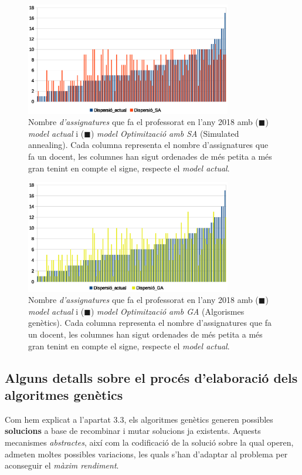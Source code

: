 \documentclass[10pt,twocolumn]{article}
\begin{document}
	\begin{figure}[!]
		\centering
		\includegraphics[width=9cm]{disp_sorted_sa}
		\caption{ \small Nombre \textit{d'assignatures} que fa el professorat en l'any 2018 amb  ({\color{blue!70}$\blacksquare$}) \textit{model actual} i ({\color{orange!70!red!90}$\blacksquare$}) \textit{model Optimització amb SA} (Simulated annealing). Cada columna representa el nombre d'assignatures que fa un docent, les columnes han sigut ordenades de més petita a més gran tenint en compte el signe, respecte el \textit{model actual}. }
		\label{fig:sor}
	\end{figure}
	\begin{figure}[!]
		\centering
		\includegraphics[width=9cm]{disp_sorted_ga}
		\caption{ \small  Nombre \textit{d'assignatures} que fa el professorat en l'any 2018 amb  ({\color{blue!70}$\blacksquare$}) \textit{model actual} i ({\color{yellow!70!gray!90}$\blacksquare$}) \textit{model Optimització amb GA} (Algorismes genètics). Cada columna representa el nombre d'assignatures que fa un docent, les columnes han sigut ordenades de més petita a més gran tenint en compte el signe, respecte el \textit{model actual}. }
		\label{fig:sorted_mo}
	\end{figure}
\newpage
\subsection{Alguns detalls sobre el procés d'elaboració dels algoritmes genètics}
\normalsize
Com hem explicat a l'apartat 3.3, els algoritmes genètics generen possibles \textbf{solucions} a base de recombinar i mutar solucions ja existents\cite{ga}. Aquests mecanismes \textit{abstractes}, així com la codificació de la solució sobre la qual operen, admeten moltes possibles variacions, les quals s'han d'adaptar al problema per aconseguir el \textit{màxim rendiment}.
\end{document}
